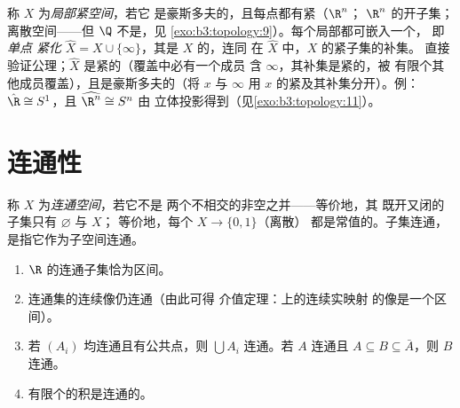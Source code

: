 \begin{definition}\label{def:b3:topology:locallycompact}
称 $X$ 为\emph{局部紧空间}，若它
是豪斯多夫的，且每点都有紧（$\R^n$；
$\R^n$ 的开子集；离散空间——但 $\Q$ 不是，见
\cref{exo:b3:topology:9}）。每个局部都可嵌入一个，
即\emph{单点
紧化} $\hat X = X
\cup \{\infty\}$，其是 $X$ 的，连同
在 $\hat X$ 中，$X$ 的紧子集的补集。
直接验证公理；$\hat X$ 是紧的（覆盖中必有一个成员
含 $\infty$，其补集是紧的，被
有限个其他成员覆盖），且是豪斯多夫的（将 $x$ 与 $\infty$
用 $x$ 的紧及其补集分开）。例：
$\hat\R \cong S^1$，且 $\widehat{\R^n} \cong S^n$ 由
立体投影得到（见\cref{exo:b3:topology:11}）。
\end{definition}

\section{连通性}

\begin{definition}\label{def:b3:topology:connected}
称 $X$ 为\emph{连通空间}，若它不是
两个不相交的非空之并——等价地，其
既开又闭的子集只有 $\varnothing$ 与 $X$；
等价地，每个 $X \to \{0, 1\}$（离散）
都是常值的。子集连通，是指它作为子空间连通。
\end{definition}

\begin{theorem}\label{thm:b3:topology:connectedbasics}
\begin{enumerate}
  \item $\R$ 的连通子集恰为区间。
  \item 连通集的连续像仍连通（由此可得
        介值定理：上的连续实映射
        的像是一个区间）。
  \item 若 $(A_i)$ 均连通且有公共点，则 $\bigcup
        A_i$ 连通。若 $A$ 连通且 $A \subseteq
        B \subseteq \bar A$，则 $B$ 连通。
  \item 有限个的积是连通的。
\end{enumerate}
\end{theorem}


